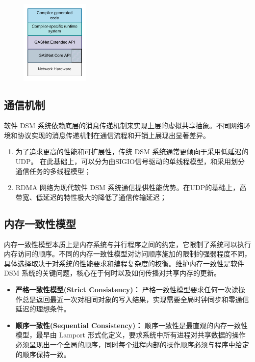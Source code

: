 {    \begin{figure}
        \centering
        \includegraphics[width=0.3\textwidth]{Img/GASNet.drawio.pdf}
        \label{fig:GASNET}
    \end{figure}

    \subsection{通信机制}
    软件 DSM 系统依赖底层的消息传递机制来实现上层的虚拟共享抽象。不同网络环境和协议实现的消息传递机制在通信流程和开销上展现出显著差异。

    \begin{enumerate}
        \item 为了追求更高的性能和可扩展性，传统 DSM 系统通常更倾向于采用低延迟的 UDP。
              在此基础上，可以分为由SIGIO信号驱动的单线程模型，和采用划分通信任务的多线程模型；
        \item RDMA 网络为现代软件 DSM 系统通信提供性能优势。在UDP的基础上，高带宽、低延迟的特性极大的降低了通信传输延迟；
    \end{enumerate}

    \subsection{内存一致性模型}
    内存一致性模型本质上是内存系统与并行程序之间的约定，它限制了系统可以执行内存访问的顺序。不同的内存一致性模型对访问顺序施加的限制的强弱程度不同，具体选择取决于对系统的性能要求和编程复杂度的权衡。维护内存一致性是软件 DSM 系统的关键问题，核心在于何时以及如何传播对共享内存的更新。

    \begin{itemize}
        \item \textbf{严格一致性模型(Strict Consistency)：} 严格一致性模型要求任何一次读操作总是返回最近一次对相同对象的写入结果，实现需要全局时钟同步和零通信延迟的理想条件。

        \item \textbf{顺序一致性(Sequential Consistency)：} 顺序一致性是最直观的内存一致性模型，最早由 Lamport 形式化定义，要求系统中所有进程对共享数据的操作必须呈现出一个全局的顺序，同时每个进程内部的操作顺序必须与程序中给定的顺序保持一致。


\end{itemize}}

